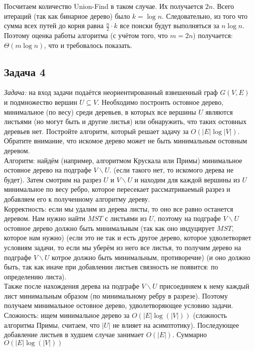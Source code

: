 \documentclass[a4paper,12pt]{article} %
\begin{document}
Посчитаем количество Union-Find в таком случае. Их получается $ 2n $. Всего итераций (так как бинарное дерево) было $ k = \log n $. Следовательно, из того что сумма всех путей до корня равна $ \frac{n}{2} \cdot k $ все поиски будут выполняться за $ n \log n $. Поэтому оценка работы алгоритма (с учётом того, что $ m = 2n $) получается: $ \Theta(m \log n) $, что и требовалось показать.

\subsection*{Задача 4}
\textit{Задача:} на вход задачи подаётся неориентированный взвешенный граф $G(V,E)$ и подмножество вершин $U \subseteq V$. Необходимо построить остовное дерево, минимальное (по весу) среди деревьев, в которых все вершины $U$ являются листьями (но могут быть и другие листья) или обнаружить, что таких остовных деревьев нет. Постройте алгоритм, который решает задачу за $O(|E|\log |V|)$. Обратите внимание, что искомое дерево может не быть минимальным остовным деревом.\\

Алгоритм: найдём (например, алгоритмом Крускала или Примы) минимальное остовное дерево на подграфе $ V  \backslash U $. (если такого нет, то искомого дерева не будет). Затем смотрим на разрез $ U $ и $ V  \backslash U $ и находим для каждой вершины из $ U $ минимальное по весу ребро, которое пересекает рассматриваемый разрез и добавляем его к полученному алгоритму дереву.\\

Корректность: если мы удалим из дерева листы, то оно все равно останется деревом. Нам нужно найти $ MST $ с листьями из $ U $, поэтому на подграфе $ V  \backslash U $ остовное дерево должно быть минимальным (так как оно индуцирует $ MST $, которое нам нужно) (если это не так и есть другое дерево, которое удволетворяет условиям задачи, то если мы уберём из него все листья, то получим дерево на подграфе $ V  \backslash U $ котрое должно быть минимальным, противоречие) (и оно должно быть, так как иначе при добавлении листьев связность не появится: по определению листа).\\ 
Также после нахождения дерева на подграфе $ V  \backslash U $ присоединяем к нему каждый лист минимальным образом (по минимальному ребру в разрезе). Поэтому получаем минимальное остовное дерево, удволетворяющее условию задачи.\\

Сложность: ищем минимальное дерево за $ O(|E| \log(|V|)) $ (сложность алгоритма Примы, считаем, что $ |U| $ не влияет на асимптотику). Последующее добавление листьев в худшем случае занимает $ O(|E|) $. Суммарно $ O(|E| \log(|V|)) $
\end{document}
